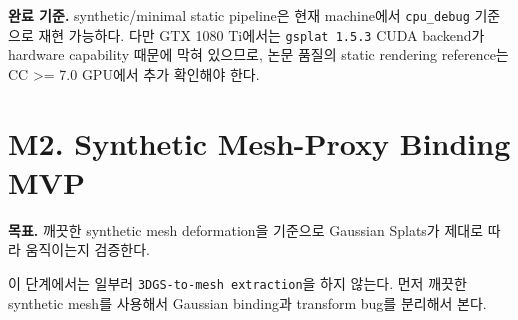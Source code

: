 \documentclass[10pt]{article}
\newcommand{\code}[1]{\texttt{#1}}
\begin{document}
\textbf{완료 기준.} synthetic/minimal static pipeline은 현재 machine에서 \code{cpu\_debug} 기준으로 재현 가능하다. 다만 GTX 1080 Ti에서는 \code{gsplat 1.5.3} CUDA backend가 hardware capability 때문에 막혀 있으므로, 논문 품질의 static rendering reference는 CC >= 7.0 GPU에서 추가 확인해야 한다.

\section{M2. Synthetic Mesh-Proxy Binding MVP}

\textbf{목표.} 깨끗한 synthetic mesh deformation을 기준으로 Gaussian Splats가 제대로 따라 움직이는지 검증한다.

\begin{tcolorbox}[colback=LightGray, colframe=black!20, title=mesh extraction을 뒤로 미루는 이유, fonttitle=\bfseries]
이 단계에서는 일부러 \code{3DGS-to-mesh extraction}을 하지 않는다. 먼저 깨끗한 synthetic mesh를 사용해서 Gaussian binding과 transform bug를 분리해서 본다.
\end{tcolorbox}
\end{document}
